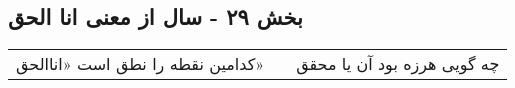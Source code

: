 \begin{center}
\section*{بخش ۲۹ - سال از معنی انا الحق}
\label{sec:sh029}
\begin{longtable}{l p{0.5cm} r}
کدامین نقطه را نطق است «اناالحق»
&&
چه گویی هرزه بود آن یا محقق
\\
\end{longtable}
\end{center}
